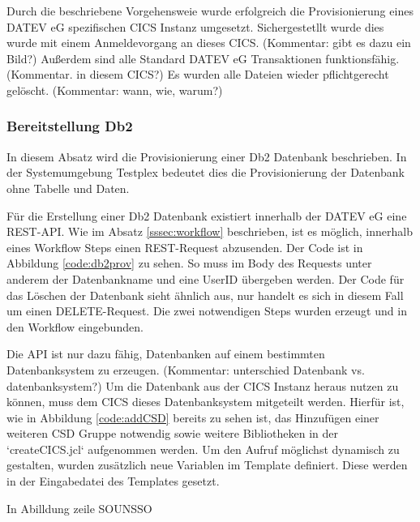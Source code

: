 Durch die beschriebene Vorgehensweie wurde erfolgreich die Provisionierung eines DATEV eG spezifischen CICS Instanz umgesetzt.
Sichergestetllt wurde dies wurde mit einem Anmeldevorgang an dieses CICS. (Kommentar: gibt es dazu ein Bild?)
Außerdem sind alle Standard DATEV eG Transaktionen funktionsfähig. (Kommentar. in diesem CICS?)
Es wurden alle Dateien wieder pflichtgerecht gelöscht. (Kommentar: wann, wie, warum?)

\subsubsection{Bereitstellung Db2}\label{sssec:db2tpl}
In diesem Absatz wird die Provisionierung einer Db2 Datenbank beschrieben.
In der Systemumgebung Testplex bedeutet dies die Provisionierung der Datenbank ohne Tabelle und Daten.

Für die Erstellung einer Db2 Datenbank existiert innerhalb der DATEV eG eine REST-API.
Wie im Absatz \ref{sssec:workflow} beschrieben, ist es möglich, innerhalb eines Workflow Steps einen REST-Request abzusenden.
Der Code ist in Abbildung \ref{code:db2prov} zu sehen.
So muss im Body des Requests unter anderem der Datenbankname und eine UserID übergeben werden.
Der Code für das Löschen der Datenbank sieht ähnlich aus, nur handelt es sich in diesem Fall um einen DELETE-Request.
Die zwei notwendigen Steps wurden erzeugt und in den Workflow eingebunden.

Die API ist nur dazu fähig, Datenbanken auf einem bestimmten Datenbanksystem zu erzeugen. (Kommentar: unterschied Datenbank vs. datenbanksystem?)
Um die Datenbank aus der CICS Instanz heraus nutzen zu können, muss dem CICS dieses Datenbanksystem mitgeteilt werden.
Hierfür ist, wie in Abbildung \ref{code:addCSD} bereits zu sehen ist, das Hinzufügen einer weiteren CSD Gruppe notwendig sowie weitere Bibliotheken in der `createCICS.jcl` aufgenommen werden.
Um den Aufruf möglichst dynamisch zu gestalten,  wurden zusätzlich neue Variablen im Template definiert.
Diese werden in der Eingabedatei des Templates gesetzt.

In Abilldung zeile SOUNSSO

